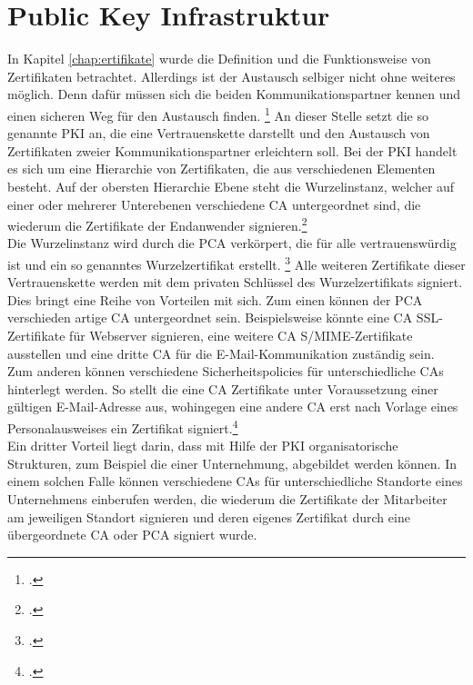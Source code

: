 \documentclass  [paper=a4,
				fontsize=12pt,
				listof=totoc,
				bibliography=totoc
				]{scrreprt}
\begin{document}
		\section{Public Key Infrastruktur}
			In Kapitel \ref*{chap:ertifikate} wurde die Definition und die Funktionsweise von Zertifikaten betrachtet. Allerdings ist der Austausch selbiger nicht ohne weiteres möglich. Denn dafür müssen sich die beiden Kommunikationspartner \glqq kennen und einen sicheren Weg für den Austausch finden\grqq{}. \footcite[][]{BSI}
			An dieser Stelle setzt die so genannte \ac{PKI} an, die eine Vertrauenskette darstellt und den Austausch von Zertifikaten zweier Kommunikationspartner erleichtern soll.
			\newpage
			Bei der \ac{PKI} handelt es sich um eine Hierarchie von Zertifikaten, die aus verschiedenen Elementen besteht. Auf der obersten Hierarchie Ebene steht die Wurzelinstanz, welcher auf einer oder mehrerer Unterebenen verschiedene \ac{CA} untergeordnet sind, die wiederum die Zertifikate der Endanwender signieren.\footcite[Vgl.][S. 23]{Schwenk}\\
			Die Wurzelinstanz wird durch die \ac{PCA} verkörpert, die  für alle vertrauenswürdig ist und ein so genanntes Wurzelzertifikat erstellt. \footcite[Vgl. ][]{ITWissen2012} 
			Alle weiteren Zertifikate dieser Vertrauenskette werden mit dem privaten Schlüssel des Wurzelzertifikats signiert.\medskip\\ %
			Dies bringt eine Reihe von Vorteilen mit sich. Zum einen können der \ac{PCA} verschieden artige \ac{CA} untergeordnet sein. Beispielsweise könnte eine \ac{CA} SSL-Zertifikate für Webserver signieren, eine weitere \ac{CA} \ac{S/MIME}-Zertifikate ausstellen und eine dritte \ac{CA} für die E-Mail-Kommunikation zuständig sein.\\
			Zum anderen können verschiedene Sicherheitspolicies für unterschiedliche \acp{CA} hinterlegt werden. So stellt die eine \ac{CA} Zertifikate unter Voraussetzung einer gültigen E-Mail-Adresse aus, wohingegen eine andere \ac{CA} erst nach Vorlage eines Personalausweises ein Zertifikat signiert.\footcite[Vgl.][S. 24]{Schwenk}\\
			Ein dritter Vorteil liegt darin, dass mit Hilfe der \ac{PKI} organisatorische Strukturen, zum Beispiel die einer Unternehmung, abgebildet werden können. In einem solchen Falle können verschiedene \ac{CA}s für unterschiedliche Standorte eines Unternehmens einberufen werden, die wiederum die Zertifikate der Mitarbeiter am jeweiligen Standort signieren und deren eigenes Zertifikat durch eine übergeordnete \ac{CA} oder \ac{PCA} signiert wurde.\medskip\\
\end{document}
